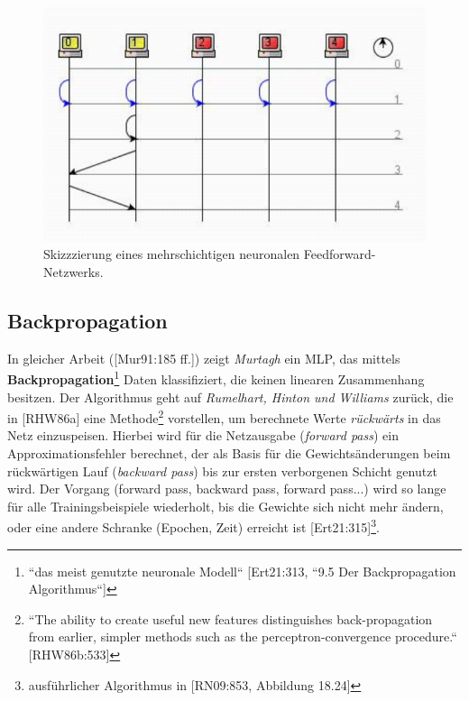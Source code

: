 \begin{figure}[h]
    \centering
    \includegraphics{images/p1ReadSeq.pdf}
    \caption{Skizzzierung eines mehrschichtigen neuronalen Feedforward-Netzwerks.}
    \label{fig-multilayerfeedforward}
\end{figure}



\subsection{Backpropagation}
In gleicher Arbeit ([Mur91:185 ff.]) zeigt \textit{Murtagh} ein MLP, das mittels \textbf{Backpropagation}\footnote{
    ``das meist genutzte neuronale Modell`` [Ert21:313, ``9.5 Der Backpropagation Algorithmus``]
} Daten klassifiziert, die keinen linearen Zusammenhang besitzen.
Der Algorithmus geht auf \textit{Rumelhart, Hinton und Williams} zurück, die in [RHW86a] eine Methode\footnote{
    ``The ability to create useful new features distinguishes back-propagation from earlier, simpler methods such as the perceptron-convergence procedure.`` [RHW86b:533]
} vorstellen, um berechnete Werte \textit{rückwärts} in das Netz einzuspeisen.
Hierbei wird für die Netzausgabe (\textit{forward pass}) ein Approximationsfehler berechnet, der als Basis für die Gewichtsänderungen beim rückwärtigen Lauf (\textit{backward pass}) bis zur ersten verborgenen Schicht genutzt wird.
Der Vorgang (forward pass, backward pass, forward pass...) wird so lange für alle Trainingsbeispiele wiederholt, bis die Gewichte sich nicht mehr ändern, oder eine andere Schranke (Epochen, Zeit) erreicht ist [Ert21:315]\footnote{
    ausführlicher Algorithmus in [RN09:853, Abbildung 18.24]
}.



